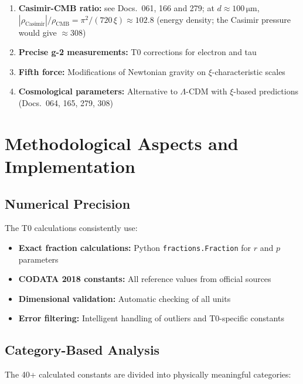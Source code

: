 	\begin{enumerate}
		\item \textbf{Casimir-CMB ratio:} see Docs.~061, 166 and 279; at $d \approx 100\,\si{\micro\meter}$, $|\rho_{\text{Casimir}}|/\rho_{\text{CMB}} = \pi^2/(720\,\xi) \approx 102.8$ (energy density; the Casimir pressure would give $\approx 308$)
		\item \textbf{Precise g-2 measurements:} T0 corrections for electron and tau
		\item \textbf{Fifth force:} Modifications of Newtonian gravity on $\xi$-characteristic scales
		\item \textbf{Cosmological parameters:} Alternative to $\Lambda$-CDM with $\xi$-based predictions (Docs.~064, 165, 279, 308)
	\end{enumerate}
	
	\section{Methodological Aspects and Implementation}
	
	\subsection{Numerical Precision}
	
	The T0 calculations consistently use:
	
	\begin{itemize}
		\item \textbf{Exact fraction calculations:} Python \texttt{fractions.Fraction} for $r$ and $p$ parameters
		\item \textbf{CODATA 2018 constants:} All reference values from official sources
		\item \textbf{Dimensional validation:} Automatic checking of all units
		\item \textbf{Error filtering:} Intelligent handling of outliers and T0-specific constants
	\end{itemize}
	
	\subsection{Category-Based Analysis}
	
	The 40+ calculated constants are divided into physically meaningful categories:
	
